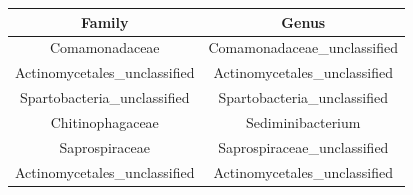 \documentclass[]{article}
\begin{document}
\begin{longtable}[]{@{}cc@{}}
\toprule
\begin{minipage}[b]{0.42\columnwidth}\centering\strut
Family\strut
\end{minipage} & \begin{minipage}[b]{0.42\columnwidth}\centering\strut
Genus\strut
\end{minipage}\tabularnewline
\midrule
\endhead
\begin{minipage}[t]{0.42\columnwidth}\centering\strut
Comamonadaceae\strut
\end{minipage} & \begin{minipage}[t]{0.42\columnwidth}\centering\strut
Comamonadaceae\_unclassified\strut
\end{minipage}\tabularnewline
\begin{minipage}[t]{0.42\columnwidth}\centering\strut
Actinomycetales\_unclassified\strut
\end{minipage} & \begin{minipage}[t]{0.42\columnwidth}\centering\strut
Actinomycetales\_unclassified\strut
\end{minipage}\tabularnewline
\begin{minipage}[t]{0.42\columnwidth}\centering\strut
Spartobacteria\_unclassified\strut
\end{minipage} & \begin{minipage}[t]{0.42\columnwidth}\centering\strut
Spartobacteria\_unclassified\strut
\end{minipage}\tabularnewline
\begin{minipage}[t]{0.42\columnwidth}\centering\strut
Chitinophagaceae\strut
\end{minipage} & \begin{minipage}[t]{0.42\columnwidth}\centering\strut
Sediminibacterium\strut
\end{minipage}\tabularnewline
\begin{minipage}[t]{0.42\columnwidth}\centering\strut
Saprospiraceae\strut
\end{minipage} & \begin{minipage}[t]{0.42\columnwidth}\centering\strut
Saprospiraceae\_unclassified\strut
\end{minipage}\tabularnewline
\begin{minipage}[t]{0.42\columnwidth}\centering\strut
Actinomycetales\_unclassified\strut
\end{minipage} & \begin{minipage}[t]{0.42\columnwidth}\centering\strut
Actinomycetales\_unclassified\strut

\end{minipage}
\end{longtable}
\end{document}
